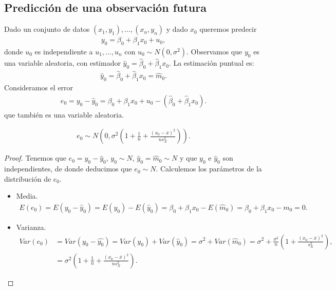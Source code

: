 \subsection{Predicción de una observación futura}
Dado un conjunto de datos $(x_1, y_1), \dots, (x_n, y_n)$ y dado $x_0$ queremos predecir
\begin{align*}
    y_0 = \beta_0 + \beta_1 x_0 + u_0,
\end{align*}
donde $u_0$ es independiente a $u_1, \dots, u_n$ con $u_0 \sim N(0, \sigma^2)$. Observamos que $y_0$ es una variable aleatoria, con estimador $\widehat{y}_0 = \widehat{\beta}_0 + \widehat{\beta}_1x_0$. La estimación puntual es:
\begin{align*}
    \widehat{y}_0 = \widehat{\beta}_0 + \hat{\beta}_1x_0 = \widehat{m}_0.
\end{align*}
Consideramos el error
\begin{align*}
    e_0 = y_0 - \widehat{y}_0 = \beta_0 + \beta_1x_0 + u_0 - (\widehat{\beta}_0 + \widehat{\beta}_1x_0).
\end{align*}
que también es una variable aleatoria.
\begin{teo}
    \begin{align*}
        e_0 \sim N \left( 0, \sigma^2 \left(1+\frac{1}{n}+\frac{(x_0-\overline{x})^2}{ns_X^2} \right) \right).
    \end{align*}
\end{teo}

\begin{proof}
    Tenemos que $e_0 = y_0 - \widehat{y}_0$, $y_0 \sim N$, $\widehat{y}_0 = \widehat{m}_0 \sim N$ y que $y_0$ e $\widehat{y}_0$ son independientes, de donde deducimos que $e_0 \sim N$. Calculemos los parámetros de la distribución de $e_0$.
    \begin{itemize}
        \item Media.
              \begin{align*}
                  E(e_0) = E(y_0 - \widehat{y}_0) = E(y_0) - E(\widehat{y}_0) = \beta_0 + \beta_1 x_0 - E(\widehat{m}_0)
                  = \beta_0 + \beta_1 x_0 - m_0 = 0.
              \end{align*}
        \item Varianza.
              \begin{align*}
                  Var(e_0) & = Var(y_0 - \widehat{y_0}) = Var(y_0) + Var(\widehat{y}_0) = \sigma^2 + Var(\widehat{m}_0) = \sigma^2 + \frac{\sigma^2}{n}\left( 1 + \frac{(x_0 - \overline{x})^2}{s_X^2} \right), \\
                           & = \sigma^2 \left(1+\frac{1}{n}+\frac{(x_0-\overline{x})^2}{ns_X^2} \right).
              \end{align*}
    \end{itemize}
\end{proof}

